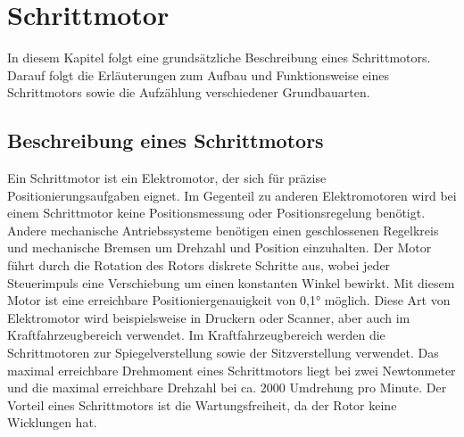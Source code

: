 
%

\chapter{Schrittmotor}
In diesem Kapitel folgt eine grundsätzliche Beschreibung eines Schrittmotors. Darauf folgt die Erläuterungen zum Aufbau und Funktionsweise eines Schrittmotors sowie die Aufzählung verschiedener Grundbauarten.
\section{Beschreibung eines Schrittmotors}
Ein Schrittmotor ist ein Elektromotor, der sich für präzise Positionierungsaufgaben eignet. Im Gegenteil zu anderen Elektromotoren wird bei einem Schrittmotor keine Positionsmessung oder Positionsregelung benötigt. Andere mechanische Antriebssysteme benötigen einen geschlossenen Regelkreis und mechanische Bremsen um Drehzahl und Position einzuhalten. Der Motor führt durch die Rotation des Rotors diskrete Schritte aus, wobei jeder Steuerimpuls eine Verschiebung um einen konstanten Winkel bewirkt. Mit diesem Motor ist eine erreichbare Positioniergenauigkeit von 0,1° möglich. Diese Art von Elektromotor wird beispielsweise in Druckern oder Scanner, aber auch im Kraftfahrzeugbereich verwendet. Im Kraftfahrzeugbereich werden die Schrittmotoren zur Spiegelverstellung sowie der Sitzverstellung verwendet. Das maximal erreichbare Drehmoment eines Schrittmotors liegt bei zwei Newtonmeter und die maximal erreichbare Drehzahl bei ca. 2000 Umdrehung pro Minute. Der Vorteil eines Schrittmotors ist die Wartungsfreiheit, da der Rotor keine Wicklungen hat. \cite{Babiel.2023}\cite{Hagl.2021}\cite{Bernstein.2018}\cite{Schroder.2021}
